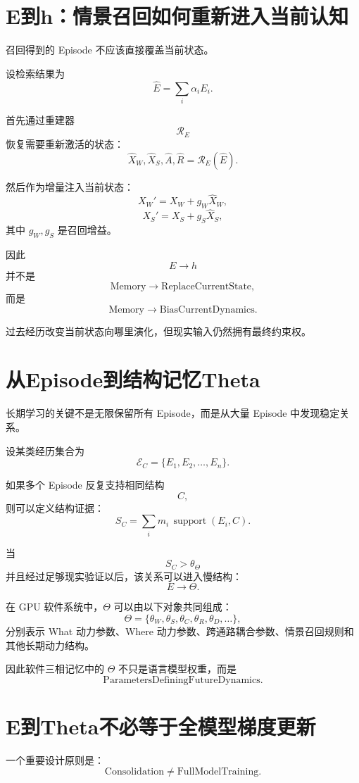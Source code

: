 \section{E到h：情景召回如何重新进入当前认知}

召回得到的 Episode 不应该直接覆盖当前状态。

设检索结果为
\[
\hat E
=
\sum_i \alpha_iE_i.
\]

首先通过重建器
\[
\mathcal R_E
\]
恢复需要重新激活的状态：
\[
\hat X_W,
\hat X_S,
\hat A,
\hat R
=
\mathcal R_E(\hat E).
\]

然后作为增量注入当前状态：
\[
X_W'
=
X_W
+
g_W\hat X_W,
\]
\[
X_S'
=
X_S
+
g_S\hat X_S,
\]
其中 $g_W,g_S$ 是召回增益。

因此
\[
E\rightarrow h
\]
并不是
\[
\mathrm{Memory}
\rightarrow
\mathrm{ReplaceCurrentState},
\]
而是
\[
\boxed{
\mathrm{Memory}
\rightarrow
\mathrm{BiasCurrentDynamics}.
}
\]

过去经历改变当前状态向哪里演化，但现实输入仍然拥有最终约束权。

\section{从Episode到结构记忆Theta}

长期学习的关键不是无限保留所有 Episode，而是从大量 Episode 中发现稳定关系。

设某类经历集合为
\[
\mathcal E_C
=
\{
E_1,E_2,\ldots,E_n
\}.
\]

如果多个 Episode 反复支持相同结构
\[
C,
\]
则可以定义结构证据：
\[
S_C
=
\sum_i
m_i
\,\operatorname{support}(E_i,C).
\]

当
\[
S_C>\theta_\Theta
\]
并且经过足够现实验证以后，该关系可以进入慢结构：
\[
\boxed{
E\rightarrow\Theta.
}
\]

在 GPU 软件系统中，$\Theta$ 可以由以下对象共同组成：
\[
\Theta
=
\{
\theta_W,
\theta_S,
\theta_C,
\theta_R,
\theta_D,
\ldots
\},
\]
分别表示 What 动力参数、Where 动力参数、跨通路耦合参数、情景召回规则和其他长期动力结构。

因此软件三相记忆中的 $\Theta$ 不只是语言模型权重，而是
\[
\boxed{
\mathrm{ParametersDefiningFutureDynamics}.
}
\]

\section{E到Theta不必等于全模型梯度更新}

一个重要设计原则是：
\[
\boxed{
\mathrm{Consolidation}
\neq
\mathrm{FullModelTraining}.
}
\]

